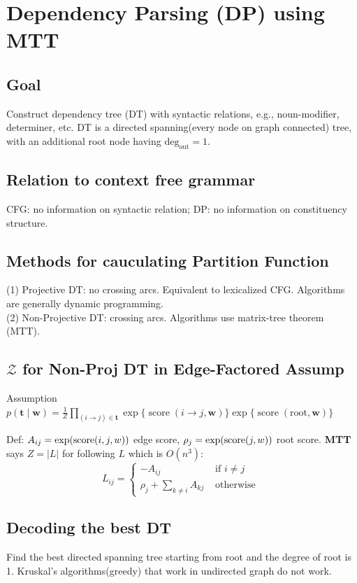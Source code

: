 \section{Dependency Parsing (DP) using MTT}

\subsection*{Goal} Construct dependency tree (DT) with syntactic relations, e.g., noun-modifier, determiner, etc. DT is a directed spanning(every node on graph connected) tree, with an additional root node having $\mathrm{deg}_{\mathrm{out}}=1$.

\subsection*{Relation to context free grammar}
CFG: no information on syntactic relation; DP: no information on constituency structure. 

\subsection*{Methods for cauculating Partition Function} 
(1) Projective DT: no crossing arcs. Equivalent to lexicalized CFG. Algorithms are generally dynamic programming. \\
(2) Non-Projective DT: crossing arcs. Algorithms use matrix-tree theorem (MTT).


\subsection*{$\mathcal{Z}$ for Non-Proj DT in Edge-Factored Assump}
Assumption $p(\mathbf{t} \mid \mathbf{w})=\frac{1}{Z} \prod_{(i \rightarrow j) \in \mathbf{t}} \exp \{\operatorname{score}(i\to j, \mathbf{w})\} \exp \{\operatorname{score}(\mathrm{root}, \mathbf{w})\}$

Def: $A_{ij}=\exp(\text{score}(i,j,w))$ edge score, $\rho_j = \exp(\text{score}(j,w))$ root score. \textbf{MTT} says $Z=|L|$ for following $L$ which is $O(n^3)$:
\vspace{-0.3cm}
$$L_{i j}= \begin{cases}-A_{i j} & \text { if } i \neq j \\ \rho_{j}+\sum_{k \neq i} A_{k j} & \text { otherwise }\end{cases}$$
\vspace{-0.3cm}

\subsection*{Decoding the best DT}
Find the best directed spanning tree starting from root and the degree of root is 1. \; Kruskal’s algorithms(greedy) that work in undirected graph do not work.

